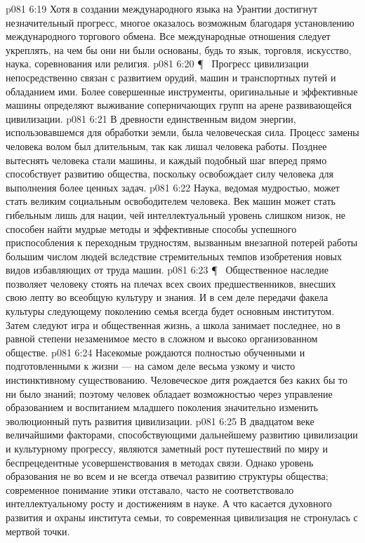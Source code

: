 \vs p081 6:19 Хотя в создании международного языка на Урантии достигнут незначительный прогресс, многое оказалось возможным благодаря установлению международного торгового обмена. Все международные отношения следует укреплять, на чем бы они ни были основаны, будь то язык, торговля, искусство, наука, соревнования или религия.
\vs p081 6:20 \P\ \bibnobreakspace {} Прогресс цивилизации непосредственно связан с развитием орудий, машин и транспортных путей и обладанием ими. Более совершенные инструменты, оригинальные и эффективные машины определяют выживание соперничающих групп на арене развивающейся цивилизации.
\vs p081 6:21 В древности единственным видом энергии, использовавшемся для обработки земли, была человеческая сила. Процесс замены человека волом был длительным, так как лишал человека работы. Позднее вытеснять человека стали машины, и каждый подобный шаг вперед прямо способствует развитию общества, поскольку освобождает силу человека для выполнения более ценных задач.
\vs p081 6:22 Наука, ведомая мудростью, может стать великим социальным освободителем человека. Век машин может стать гибельным лишь для нации, чей интеллектуальный уровень слишком низок, не способен найти мудрые методы и эффективные способы успешного приспособления к переходным трудностям, вызванным внезапной потерей работы большим числом людей вследствие стремительных темпов изобретения новых видов избавляющих от труда машин.
\vs p081 6:23 \P\ \bibnobreakspace {} Общественное наследие позволяет человеку стоять на плечах всех своих предшественников, внесших свою лепту во всеобщую культуру и знания. И в сем деле передачи факела культуры следующему поколению семья всегда будет основным институтом. Затем следуют игра и общественная жизнь, а школа занимает последнее, но в равной степени незаменимое место в сложном и высоко организованном обществе.
\vs p081 6:24 Насекомые рождаются полностью обученными и подготовленными к жизни --- на самом деле весьма узкому и чисто инстинктивному существованию. Человеческое дитя рождается без каких бы то ни было знаний; поэтому человек обладает возможностью через управление образованием и воспитанием младшего поколения значительно изменить эволюционный путь развития цивилизации.
\vs p081 6:25 В двадцатом веке величайшими факторами, способствующими дальнейшему развитию цивилизации и культурному прогрессу, являются заметный рост путешествий по миру и беспрецедентные усовершенствования в методах связи. Однако уровень образования не во всем и не всегда отвечал развитию структуры общества; современное понимание этики отставало, часто не соответствовало интеллектуальному росту и достижениям в науке. А что касается духовного развития и охраны института семьи, то современная цивилизация не стронулась с мертвой точки.
